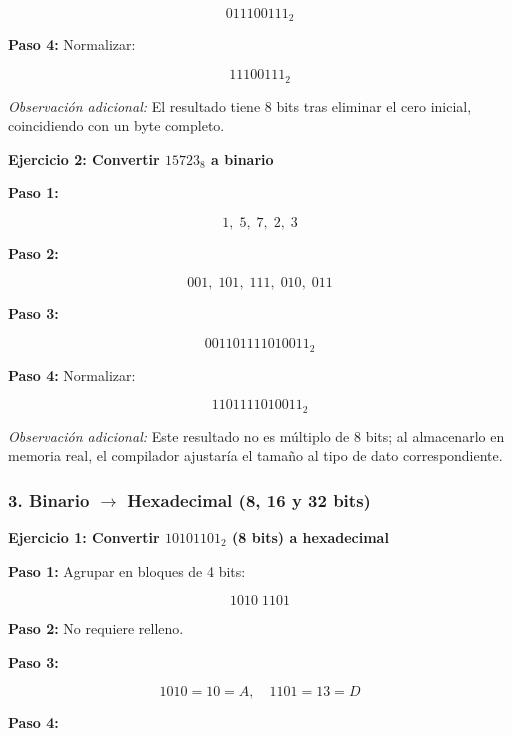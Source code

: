 \documentclass[12pt,twoside]{book}
\begin{document}
						\[
						011100111_2
						\]
						
						\noindent
						\textbf{Paso 4:} Normalizar:
						
						\[
						11100111_2
						\]
						
						\noindent
						\emph{Observación adicional:} El resultado tiene 8 bits tras eliminar el cero inicial, coincidiendo con un byte completo.
						
						\bigskip
						
						\noindent
						\textbf{Ejercicio 2: Convertir $15723_8$ a binario}
						
						\noindent
						\textbf{Paso 1:}
						
						\[
						1,\;5,\;7,\;2,\;3
						\]
						
						\noindent
						\textbf{Paso 2:}
						
						\[
						001,\;101,\;111,\;010,\;011
						\]
						
						\noindent
						\textbf{Paso 3:}
						
						\[
						001101111010011_2
						\]
						
						\noindent
						\textbf{Paso 4:} Normalizar:
						
						\[
						1101111010011_2
						\]
						
						\noindent
						\emph{Observación adicional:} Este resultado no es múltiplo de 8 bits; al almacenarlo en memoria real, el compilador ajustaría el tamaño al tipo de dato correspondiente.
						
						\subsubsection*{3. Binario $\rightarrow$ Hexadecimal (8, 16 y 32 bits)}
						
						\noindent
						\textbf{Ejercicio 1: Convertir $10101101_2$ (8 bits) a hexadecimal}
						
						\noindent
						\textbf{Paso 1:} Agrupar en bloques de 4 bits:
						
						\[
						1010\;1101
						\]
						
						\noindent
						\textbf{Paso 2:} No requiere relleno.
						
						\noindent
						\textbf{Paso 3:}
						
						\[
						1010=10=A,\quad 1101=13=D
						\]
						
						\noindent
						\textbf{Paso 4:}
						
\end{document}
